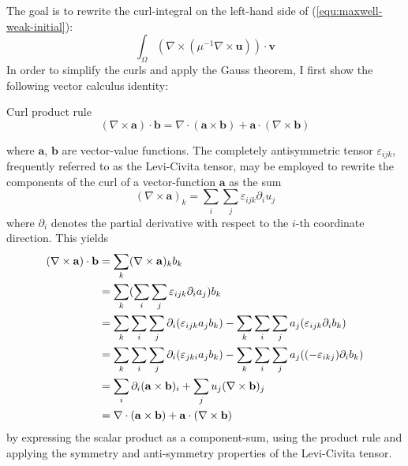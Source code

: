 \documentclass[11pt, a4paper]{article}
\begin{document}
The goal is to rewrite the curl-integral on the left-hand side of 
(\ref{equ:maxwell-weak-initial}):
\begin{equation}
    \int_{\Omega} (\nabla \times (\mu^{-1} \nabla \times \mathbf{u})) \cdot \mathbf{v} \label{equ:maxwell-weak-initial-LHS}
\end{equation}
In order to simplify the curls and apply the Gauss theorem, I first show
the following vector calculus identity:
\begin{fancybox}{Curl product rule}
    \begin{equation}
        (\nabla \times \mathbf{a}) \cdot \mathbf{b} = \nabla \cdot (\mathbf{a} \times \mathbf{b}) + \mathbf{a} \cdot (\nabla \times \mathbf{b}) \label{equ:vector-calculus}
    \end{equation}
\end{fancybox}
where $\mathbf{a}$, $\mathbf{b}$ are vector-value functions. The completely
antisymmetric tensor $\varepsilon_{ijk}$, frequently referred to as the
Levi-Civita tensor, may be employed to rewrite the components of the
curl of a vector-function $\mathbf{a}$ as the sum
\begin{equation}
    (\nabla \times \mathbf{a})_k = \sum_i \sum_j \varepsilon_{ijk} \partial_i u_j
\end{equation}
where $\partial_i$ denotes the partial derivative with respect to the $i$-th coordinate
direction. This yields
\begin{align}
    (\nabla \times \mathbf{a}) \cdot \mathbf{b} &= \sum_k (\nabla \times \mathbf{a})_k b_k \notag \\ 
    &= \sum_k (\sum_i \sum_j \varepsilon_{ijk} \partial_i a_j) b_k \notag \\ 
    &= \sum_k \sum_i \sum_j \partial_i (\varepsilon_{ijk} a_j b_k) - \sum_k \sum_i \sum_j a_j (\varepsilon_{ijk} \partial_i b_k) \notag \\ 
    &= \sum_k \sum_i \sum_j \partial_i (\varepsilon_{jki} a_j b_k) - \sum_k \sum_i \sum_j a_j ((-\varepsilon_{ikj}) \partial_i b_k) \notag \\ 
    &= \sum_i \partial_i (\mathbf{a} \times \mathbf{b})_i + \sum_j u_j (\nabla \times \mathbf{b})_j \notag \\ 
    &= \nabla \cdot (\mathbf{a} \times \mathbf{b}) + \mathbf{a} \cdot (\nabla \times \mathbf{b}) \label{equ:curlidentity} 
\end{align}
by expressing the scalar product as a component-sum, using the product rule and
applying the symmetry and anti-symmetry properties of the Levi-Civita tensor.
\end{document}
